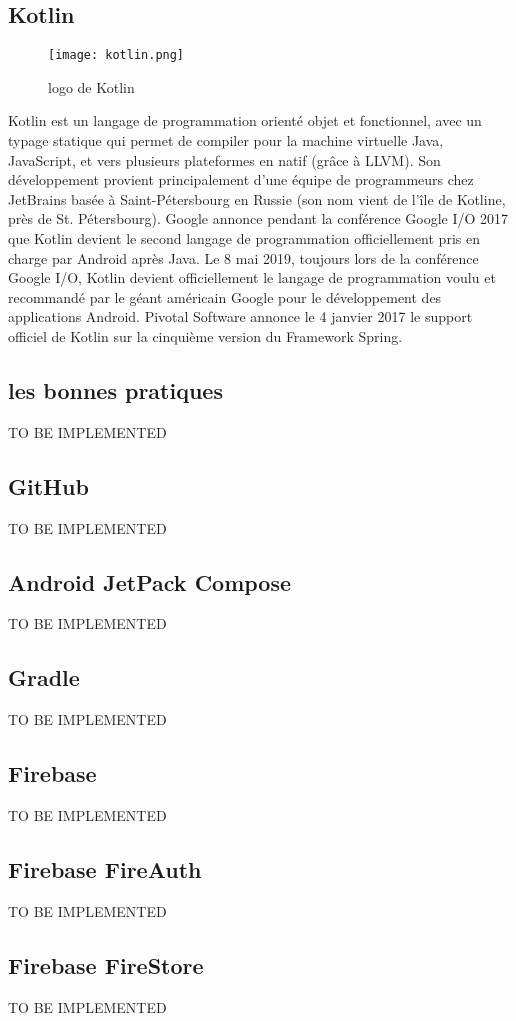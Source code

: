 \subsection{Kotlin}
\begin{wrapfigure}{r}{0.25\textwidth} 
    \centering
    \texttt{[image: kotlin.png]}
    \caption{logo de Kotlin}
\end{wrapfigure}
Kotlin est un langage de programmation orienté objet et fonctionnel, avec un typage statique qui permet de compiler pour la machine virtuelle Java, JavaScript, et vers plusieurs plateformes en natif (grâce à LLVM). Son développement provient principalement d'une équipe de programmeurs chez JetBrains basée à Saint-Pétersbourg en Russie (son nom vient de l'île de Kotline, près de St. Pétersbourg).
Google annonce pendant la conférence Google I/O 2017 que Kotlin devient le second langage de programmation officiellement pris en charge par Android après Java. Le 8 mai 2019, toujours lors de la conférence Google I/O, Kotlin devient officiellement le langage de programmation voulu et recommandé par le géant américain Google pour le développement des applications Android.
Pivotal Software annonce le 4 janvier 2017 le support officiel de Kotlin sur la cinquième version du Framework Spring. 
\cite*{wiki:Kotlin}
\subsection{les bonnes pratiques}
TO BE IMPLEMENTED
\subsection{GitHub}
TO BE IMPLEMENTED
\subsection{Android JetPack Compose}
TO BE IMPLEMENTED
\subsection{Gradle}
TO BE IMPLEMENTED
\subsection{Firebase}
TO BE IMPLEMENTED
\subsection{Firebase FireAuth}
TO BE IMPLEMENTED
\subsection{Firebase FireStore}
TO BE IMPLEMENTED
